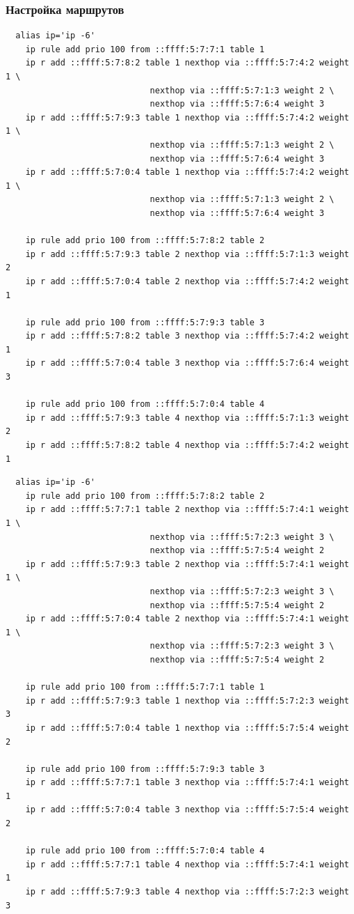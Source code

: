 \documentclass[11pt, a4paper] {ncc}
\begin{document}
        \subsubsection*{Настройка маршрутов}

\begin{verbatim}
  alias ip='ip -6'
    ip rule add prio 100 from ::ffff:5:7:7:1 table 1
    ip r add ::ffff:5:7:8:2 table 1 nexthop via ::ffff:5:7:4:2 weight 1 \
                             nexthop via ::ffff:5:7:1:3 weight 2 \
                             nexthop via ::ffff:5:7:6:4 weight 3
    ip r add ::ffff:5:7:9:3 table 1 nexthop via ::ffff:5:7:4:2 weight 1 \
                             nexthop via ::ffff:5:7:1:3 weight 2 \
                             nexthop via ::ffff:5:7:6:4 weight 3
    ip r add ::ffff:5:7:0:4 table 1 nexthop via ::ffff:5:7:4:2 weight 1 \
                             nexthop via ::ffff:5:7:1:3 weight 2 \
                             nexthop via ::ffff:5:7:6:4 weight 3

    ip rule add prio 100 from ::ffff:5:7:8:2 table 2
    ip r add ::ffff:5:7:9:3 table 2 nexthop via ::ffff:5:7:1:3 weight 2
    ip r add ::ffff:5:7:0:4 table 2 nexthop via ::ffff:5:7:4:2 weight 1

    ip rule add prio 100 from ::ffff:5:7:9:3 table 3
    ip r add ::ffff:5:7:8:2 table 3 nexthop via ::ffff:5:7:4:2 weight 1
    ip r add ::ffff:5:7:0:4 table 3 nexthop via ::ffff:5:7:6:4 weight 3

    ip rule add prio 100 from ::ffff:5:7:0:4 table 4
    ip r add ::ffff:5:7:9:3 table 4 nexthop via ::ffff:5:7:1:3 weight 2
    ip r add ::ffff:5:7:8:2 table 4 nexthop via ::ffff:5:7:4:2 weight 1
\end{verbatim}
\begin{verbatim}
  alias ip='ip -6'
    ip rule add prio 100 from ::ffff:5:7:8:2 table 2
    ip r add ::ffff:5:7:7:1 table 2 nexthop via ::ffff:5:7:4:1 weight 1 \
                             nexthop via ::ffff:5:7:2:3 weight 3 \
                             nexthop via ::ffff:5:7:5:4 weight 2
    ip r add ::ffff:5:7:9:3 table 2 nexthop via ::ffff:5:7:4:1 weight 1 \
                             nexthop via ::ffff:5:7:2:3 weight 3 \
                             nexthop via ::ffff:5:7:5:4 weight 2
    ip r add ::ffff:5:7:0:4 table 2 nexthop via ::ffff:5:7:4:1 weight 1 \
                             nexthop via ::ffff:5:7:2:3 weight 3 \
                             nexthop via ::ffff:5:7:5:4 weight 2

    ip rule add prio 100 from ::ffff:5:7:7:1 table 1
    ip r add ::ffff:5:7:9:3 table 1 nexthop via ::ffff:5:7:2:3 weight 3 
    ip r add ::ffff:5:7:0:4 table 1 nexthop via ::ffff:5:7:5:4 weight 2

    ip rule add prio 100 from ::ffff:5:7:9:3 table 3
    ip r add ::ffff:5:7:7:1 table 3 nexthop via ::ffff:5:7:4:1 weight 1
    ip r add ::ffff:5:7:0:4 table 3 nexthop via ::ffff:5:7:5:4 weight 2

    ip rule add prio 100 from ::ffff:5:7:0:4 table 4
    ip r add ::ffff:5:7:7:1 table 4 nexthop via ::ffff:5:7:4:1 weight 1
    ip r add ::ffff:5:7:9:3 table 4 nexthop via ::ffff:5:7:2:3 weight 3 
\end{verbatim}
\end{document}
